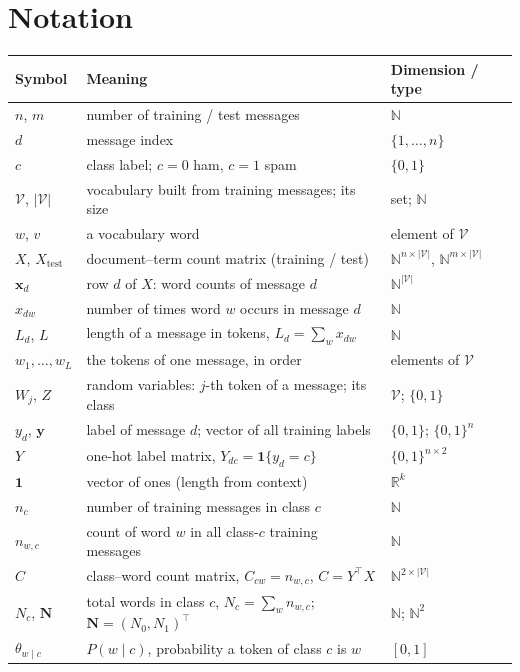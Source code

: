 \documentclass[11pt]{article}
\theoremstyle{plain}
\theoremstyle{definition}
\newcommand{\R}{\mathbb{R}}
\newcommand{\N}{\mathbb{N}}
\newcommand{\V}{\mathcal{V}}
\newcommand{\Vs}{|\mathcal{V}|}
\newcommand{\bx}{\mathbf{x}}
\begin{document}
\section{Notation}\label{sec:notation}
\begin{center}
\begin{tabularx}{\textwidth}{@{}l X l@{}}
\toprule
Symbol & Meaning & Dimension / type\\
\midrule
$n$, $m$ & number of training / test messages & $\N$\\
$d$ & message index & $\{1,\dots,n\}$\\
$c$ & class label; $c=0$ ham, $c=1$ spam & $\{0,1\}$\\
$\V$, $\Vs$ & vocabulary built from training messages; its size & set; $\N$\\
$w$, $v$ & a vocabulary word & element of $\V$\\
$X$, $X_{\text{test}}$ & document--term count matrix (training / test) & $\N^{n\times\Vs}$, $\N^{m\times\Vs}$\\
$\bx_d$ & row $d$ of $X$: word counts of message $d$ & $\N^{\Vs}$\\
$x_{dw}$ & number of times word $w$ occurs in message $d$ & $\N$\\
$L_d$, $L$ & length of a message in tokens, $L_d=\sum_w x_{dw}$ & $\N$\\
$w_1,\dots,w_{L}$ & the tokens of one message, in order & elements of $\V$\\
$W_j$, $Z$ & random variables: $j$-th token of a message; its class & $\V$; $\{0,1\}$\\
$y_d$, $\mathbf y$ & label of message $d$; vector of all training labels & $\{0,1\}$; $\{0,1\}^n$\\
$Y$ & one-hot label matrix, $Y_{dc}=\mathbf 1\{y_d=c\}$ & $\{0,1\}^{n\times 2}$\\
$\mathbf 1$ & vector of ones (length from context) & $\R^{k}$\\
$n_c$ & number of training messages in class $c$ & $\N$\\
$n_{w,c}$ & count of word $w$ in all class-$c$ training messages & $\N$\\
$C$ & class--word count matrix, $C_{cw}=n_{w,c}$, $C=Y^\top X$ & $\N^{2\times\Vs}$\\
$N_c$, $\mathbf N$ & total words in class $c$, $N_c=\sum_w n_{w,c}$; $\mathbf N=(N_0,N_1)^\top$ & $\N$; $\N^2$\\
$\theta_{w\mid c}$ & $P(w\mid c)$, probability a token of class $c$ is $w$ & $[0,1]$\\

\end{tabularx}
\end{center}
\end{document}
